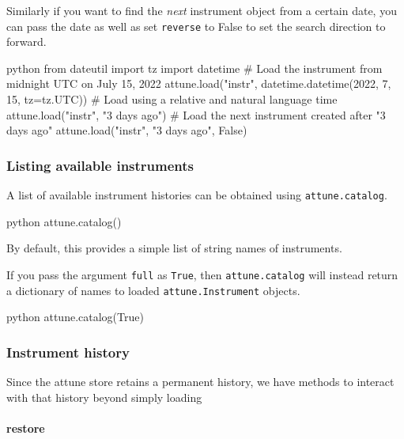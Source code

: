 Similarly if you want to find the \emph{next} instrument object from a
certain date, you can pass the date as well as set \texttt{reverse} to
False to set the search direction to forward.

\begin{codefragment}{python}
from dateutil import tz
import datetime
# Load the instrument from midnight UTC on July 15, 2022
attune.load("instr", datetime.datetime(2022, 7, 15, tz=tz.UTC))
# Load using a relative and natural language time
attune.load("instr", "3 days ago")
# Load the next instrument created after "3 days ago"
attune.load("instr", "3 days ago", False)
\end{codefragment}

\hypertarget{listing-available-instruments}{%
\subsubsection{Listing available
instruments}\label{listing-available-instruments}}

A list of available instrument histories can be obtained using
\texttt{attune.catalog}.

\begin{codefragment}{python}
attune.catalog()
\end{codefragment}

By default, this provides a simple list of string names of instruments.

If you pass the argument \texttt{full} as \texttt{True}, then
\texttt{attune.catalog} will instead return a dictionary of names to
loaded \texttt{attune.Instrument} objects.

\begin{codefragment}{python}
attune.catalog(True)
\end{codefragment}

\hypertarget{instrument-history}{%
\subsubsection{Instrument history}\label{instrument-history}}

Since the attune store retains a permanent history, we have methods to
interact with that history beyond simply loading

\hypertarget{restore}{%
\paragraph{restore}\label{restore}}

